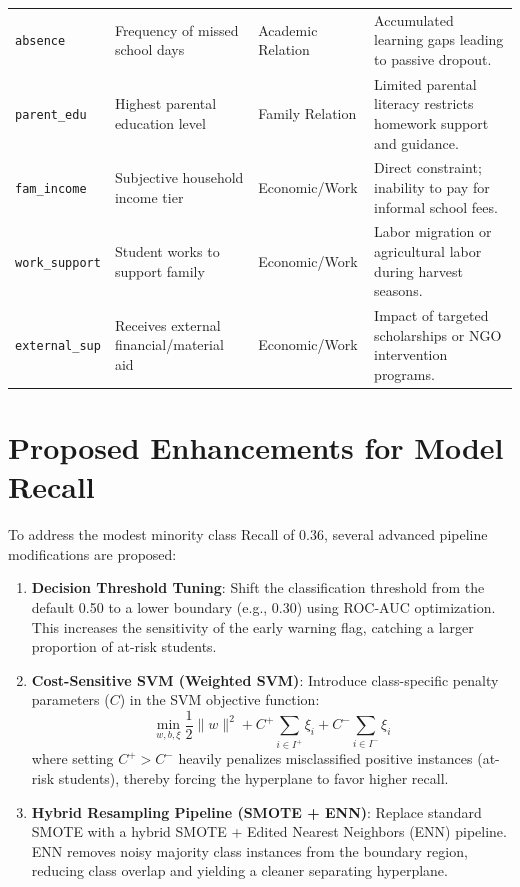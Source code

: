 \documentclass[12pt,journal,compsoc]{IEEEtran}
\begin{document}
\begin{table}[t]
\begin{tabular}{lp{4cm}p{4cm}p{4cm}}
\texttt{absence} & Frequency of missed school days & Academic Relation & Accumulated learning gaps leading to passive dropout. \\
\texttt{parent\_edu} & Highest parental education level & Family Relation & Limited parental literacy restricts homework support and guidance. \\
\texttt{fam\_income} & Subjective household income tier & Economic/Work & Direct constraint; inability to pay for informal school fees. \\
\texttt{work\_support} & Student works to support family & Economic/Work & Labor migration or agricultural labor during harvest seasons. \\
\texttt{external\_sup} & Receives external financial/material aid & Economic/Work & Impact of targeted scholarships or NGO intervention programs. \\
\bottomrule
\end{tabular}
\end{table}

\section{Proposed Enhancements for Model Recall}
\label{sec:recall_enhancements}
To address the modest minority class Recall of 0.36, several advanced pipeline modifications are proposed:
\begin{enumerate}
    \item \textbf{Decision Threshold Tuning}: Shift the classification threshold from the default 0.50 to a lower boundary (e.g., 0.30) using ROC-AUC optimization. This increases the sensitivity of the early warning flag, catching a larger proportion of at-risk students.
    \item \textbf{Cost-Sensitive SVM (Weighted SVM)}: Introduce class-specific penalty parameters ($C$) in the SVM objective function:
    \begin{equation}
        \min_{w, b, \xi} \frac{1}{2} \|w\|^2 + C^+ \sum_{i \in I^+} \xi_i + C^- \sum_{i \in I^-} \xi_i
    \end{equation}
    where setting $C^+ > C^-$ heavily penalizes misclassified positive instances (at-risk students), thereby forcing the hyperplane to favor higher recall.
    \item \textbf{Hybrid Resampling Pipeline (SMOTE + ENN)}: Replace standard SMOTE with a hybrid SMOTE + Edited Nearest Neighbors (ENN) pipeline. ENN removes noisy majority class instances from the boundary region, reducing class overlap and yielding a cleaner separating hyperplane.
\end{enumerate}



\end{document}
